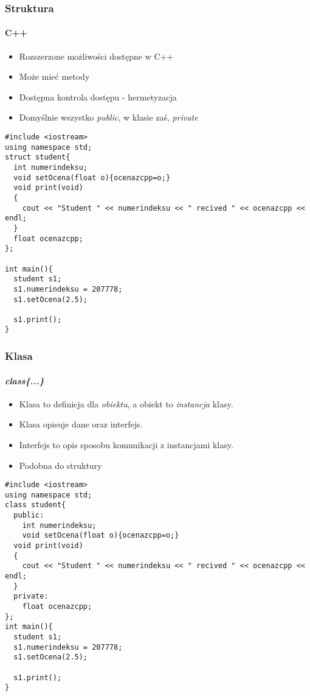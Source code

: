 \documentclass[10pt]{beamer}
\begin{document}
\begin{frame}[fragile]
  \frametitle{Struktura}
  \framesubtitle{C++}
  \centering
  \begin{itemize}
    \item Rozszerzone możliwości dostępne w C++
    \item Może mieć metody
    \item Dostępna kontrola dostępu - hermetyzacja
    \item Domyślnie wszystko \textit{public}, w klasie zaś, \textit{private}
  \end{itemize}
  
\begin{lstlisting}
#include <iostream>
using namespace std;
struct student{
  int numerindeksu;
  void setOcena(float o){ocenazcpp=o;}
  void print(void)
  {
    cout << "Student " << numerindeksu << " recived " << ocenazcpp << endl;
  }
  float ocenazcpp;
};

int main(){
  student s1;
  s1.numerindeksu = 207778;
  s1.setOcena(2.5);
  
  s1.print();
}
\end{lstlisting}
\end{frame}

\begin{frame}[fragile]
  \frametitle{Klasa}
  \framesubtitle{\textit{class\{...\}}}
  \centering
  
  \begin{itemize}
    \item Klasa to definicja dla \textit{obiektu}, a obiekt to \textit{instancja} klasy.
    \item Klasa opisuje dane oraz interfejs.
    \item Interfejs to opis sposobu komunikacji z instancjami klasy.
    \item Podobna do struktury
  \end{itemize}

\begin{lstlisting}
#include <iostream>
using namespace std;
class student{
  public:
    int numerindeksu;
    void setOcena(float o){ocenazcpp=o;}
  void print(void)
  {
    cout << "Student " << numerindeksu << " recived " << ocenazcpp << endl;
  }
  private:
    float ocenazcpp;
};
int main(){
  student s1;
  s1.numerindeksu = 207778;
  s1.setOcena(2.5);
  
  s1.print();
}
\end{lstlisting}
\end{frame}
\end{document}
